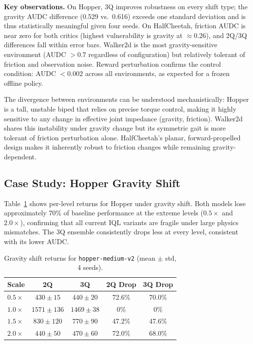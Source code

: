 \documentclass[conference]{IEEEtran}
\begin{document}
\textbf{Key observations.}
On Hopper, 3Q improves robustness on every shift type; the gravity AUDC
difference (0.529 vs.\ 0.616) exceeds one standard deviation and is thus
statistically meaningful given four seeds. On HalfCheetah, friction AUDC is
near zero for both critics (highest vulnerability is gravity at
${\approx}0.26$), and 2Q/3Q differences fall within error bars. Walker2d is
the most gravity-sensitive environment (AUDC $>0.7$ regardless of
configuration) but relatively tolerant of friction and observation noise.
Reward perturbation confirms the control condition: AUDC $<0.002$ across all
environments, as expected for a frozen offline policy.

The divergence between environments can be understood mechanistically: Hopper
is a tall, unstable biped that relies on precise torque control, making it
highly sensitive to any change in effective joint impedance (gravity,
friction). Walker2d shares this instability under gravity change but its
symmetric gait is more tolerant of friction perturbation alone.
HalfCheetah's planar, forward-propelled design makes it inherently robust to
friction changes while remaining gravity-dependent.

\subsection{Case Study: Hopper Gravity Shift}

Table~\ref{tab:hopper-gravity} shows per-level returns for Hopper under
gravity shift. Both models lose approximately 70\% of baseline performance at
the extreme levels ($0.5\times$ and $2.0\times$), confirming that all current
IQL variants are fragile under large physics mismatches. The 3Q ensemble
consistently drops less at every level, consistent with its lower AUDC.

\begin{table}[t]
  \centering
  \caption{Gravity shift returns for \texttt{hopper-medium-v2}
           (mean $\pm$ std, 4 seeds).}
  \label{tab:hopper-gravity}
  \begin{tabular}{lcccc}
    \toprule
    Scale       & 2Q           & 3Q           & 2Q Drop & 3Q Drop \\
    \midrule
    $0.5\times$ & $430\pm15$   & $440\pm20$   & 72.6\%  & 70.0\% \\
    $1.0\times$ & $1571\pm136$ & $1469\pm38$  & 0\%     & 0\% \\
    $1.5\times$ & $830\pm120$  & $770\pm90$   & 47.2\%  & 47.6\% \\
    $2.0\times$ & $440\pm50$   & $470\pm60$   & 72.0\%  & 68.0\% \\
    \bottomrule
  \end{tabular}
\end{table}
\end{document}
